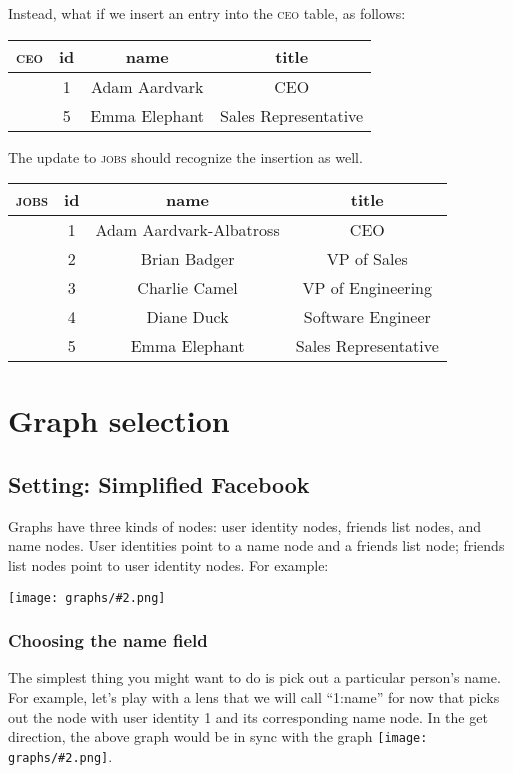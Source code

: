 \documentclass{article}
\newcommand{\scaledgraph}[2]{\texttt{[image: graphs/\#2.png]}}
\newcommand{\graph}[1]{\scaledgraph{0.5}{#1}}
\newcommand{\centeredgraph}[1]{\begin{center}\graph{#1}\end{center}}
\newcommand{\inlinegraph}[1]{\scaledgraph{0.2}{#1}}
\begin{document}
Instead, what if we insert an entry into the \textsc{ceo} table, as follows:
\begin{center} \begin{tabular} {c | c c c}
    \textsc{ceo} & id & name & title \\
    \hline
    & 1 & Adam Aardvark & CEO \\
    & 5 & Emma Elephant & Sales Representative
\end{tabular} \end{center}
The update to \textsc{jobs} should recognize the insertion as well.
\begin{center} \begin{tabular} {c | c c c}
    \textsc{jobs} & id & name & title \\
    \hline
    & 1 & Adam Aardvark-Albatross & CEO \\
    & 2 & Brian Badger & VP of Sales \\
    & 3 & Charlie Camel & VP of Engineering \\
    & 4 & Diane Duck & Software Engineer \\
    & 5 & Emma Elephant & Sales Representative
\end{tabular} \end{center}


\section{Graph selection}
\subsection*{Setting: Simplified Facebook}
Graphs have three kinds of nodes: user identity nodes, friends list nodes,
and name nodes. User identities point to a name node and a friends list
node; friends list nodes point to user identity nodes. For example:

\centeredgraph{facebook-start}

\subsubsection*{Choosing the name field}
The simplest thing you might want to do is pick out a particular person's
name. For example, let's play with a lens that we will call ``1:name'' for
now that picks out the node with user identity 1 and its corresponding name
node. In the get direction, the above graph would be in sync with the graph
\inlinegraph{facebook-name-dw}.
\end{document}
